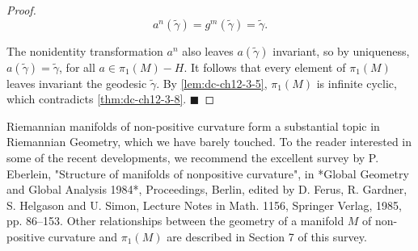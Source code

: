 \begin{proof}
  $$
  a^n(\tilde{\gamma})=g^m(\tilde{\gamma})=\tilde{\gamma}.
  $$
  
  The nonidentity transformation $a^n$ also leaves $a(\tilde{\gamma})$ invariant, so
  by uniqueness, $a(\tilde{\gamma})=\tilde{\gamma}$, for all $a\in\pi_1(M)-H$. It
  follows that every element of $\pi_1(M)$ leaves invariant the geodesic
  $\tilde{\gamma}$. By \cref{lem:dc-ch12-3-5}, $\pi_1(M)$ is infinite cyclic, which contradicts
  \cref{thm:dc-ch12-3-8}. $\blacksquare$
\end{proof}

\begin{remark}[Remark 3.11]
  \label{rem:dc-ch12-3-11}
  Riemannian manifolds of non-positive curvature form a substantial topic in
  Riemannian Geometry, which we have barely touched. To the reader interested in
  some of the recent developments, we recommend the excellent survey by P. Eberlein,
  "Structure of manifolds of nonpositive curvature", in *Global Geometry and Global
  Analysis 1984*, Proceedings, Berlin, edited by D. Ferus, R. Gardner, S. Helgason
  and U. Simon, Lecture Notes in Math. 1156, Springer Verlag, 1985, pp. 86–153.
  Other relationships between the geometry of a manifold $M$ of
  non-positive curvature and $\pi_1(M)$ are described in Section 7 of this survey.
\end{remark}
